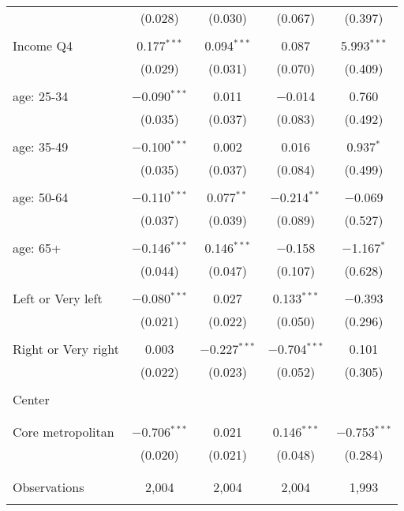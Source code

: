\begin{tabular}{@{\extracolsep{5pt}}lcccc}
  & (0.028) & (0.030) & (0.067) & (0.397) \\ 
  & & & & \\ 
 Income Q4 & 0.177$^{***}$ & 0.094$^{***}$ & 0.087 & 5.993$^{***}$ \\ 
  & (0.029) & (0.031) & (0.070) & (0.409) \\ 
  & & & & \\ 
 age: 25-34 & $-$0.090$^{***}$ & 0.011 & $-$0.014 & 0.760 \\ 
  & (0.035) & (0.037) & (0.083) & (0.492) \\ 
  & & & & \\ 
 age: 35-49 & $-$0.100$^{***}$ & 0.002 & 0.016 & 0.937$^{*}$ \\ 
  & (0.035) & (0.037) & (0.084) & (0.499) \\ 
  & & & & \\ 
 age: 50-64 & $-$0.110$^{***}$ & 0.077$^{**}$ & $-$0.214$^{**}$ & $-$0.069 \\ 
  & (0.037) & (0.039) & (0.089) & (0.527) \\ 
  & & & & \\ 
 age: 65+ & $-$0.146$^{***}$ & 0.146$^{***}$ & $-$0.158 & $-$1.167$^{*}$ \\ 
  & (0.044) & (0.047) & (0.107) & (0.628) \\ 
  & & & & \\ 
 Left or Very left & $-$0.080$^{***}$ & 0.027 & 0.133$^{***}$ & $-$0.393 \\ 
  & (0.021) & (0.022) & (0.050) & (0.296) \\ 
  & & & & \\ 
 Right or Very right & 0.003 & $-$0.227$^{***}$ & $-$0.704$^{***}$ & 0.101 \\ 
  & (0.022) & (0.023) & (0.052) & (0.305) \\ 
  & & & & \\ 
 Center &  &  &  &  \\ 
  &  &  &  &  \\ 
  & & & & \\ 
 Core metropolitan & $-$0.706$^{***}$ & 0.021 & 0.146$^{***}$ & $-$0.753$^{***}$ \\ 
  & (0.020) & (0.021) & (0.048) & (0.284) \\ 
  & & & & \\ 
\hline \\[-1.8ex] 

Observations & 2,004 & 2,004 & 2,004 & 1,993 \\ 
\hline 
\hline \\[-1.8ex] 
\end{tabular} 